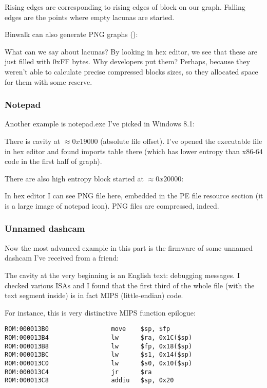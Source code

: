 Rising edges are corresponding to rising edges of block on our graph.
Falling edges are the points where empty lacunas are started.

Binwalk can also generate PNG graphs ():



What can we say about lacunas? By looking in hex editor, we see that these are just filled with 0xFF bytes.
Why developers put them?
Perhaps, because they weren't able to calculate precise compressed blocks sizes, so they allocated space
for them with some reserve.

\subsubsection{Notepad}


Another example is notepad.exe I've picked in Windows 8.1:



There is cavity at $\approx 0x19000$ (absolute file offset).
I've opened the executable file in hex editor and found imports table there (which has lower entropy than x86-64 code
in the first half of graph).

There are also high entropy block started at $\approx 0x20000$:



In hex editor I can see PNG file here, embedded in the PE file resource section (it is a large image of notepad icon).
PNG files are compressed, indeed.

\subsubsection{Unnamed dashcam}

Now the most advanced example in this part is the firmware of some unnamed dashcam I've received from a friend:



The cavity at the very beginning is an English text: debugging messages.
I checked various \ac{ISA}s and I found that 
the first third of the whole file (with the text segment inside) is in fact MIPS (little-endian) code.

For instance, this is very distinctive MIPS function epilogue:

\begin{lstlisting}[style=customasmMIPS]
ROM:000013B0                 move    $sp, $fp
ROM:000013B4                 lw      $ra, 0x1C($sp)
ROM:000013B8                 lw      $fp, 0x18($sp)
ROM:000013BC                 lw      $s1, 0x14($sp)
ROM:000013C0                 lw      $s0, 0x10($sp)
ROM:000013C4                 jr      $ra
ROM:000013C8                 addiu   $sp, 0x20
\end{lstlisting}

